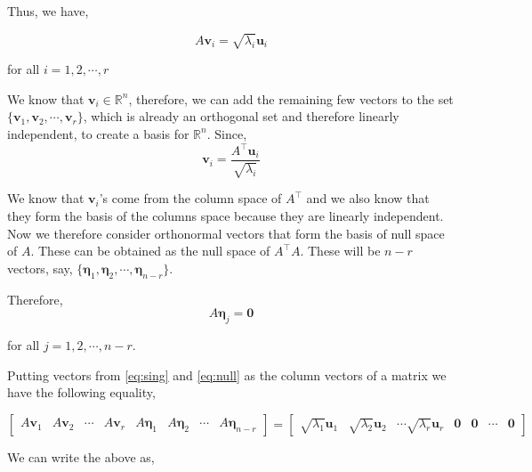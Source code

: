 \documentclass[a4paper]{article}
\begin{document}
Thus, we have,

\begin{equation}
A\boldsymbol{v}_i = \sqrt{\lambda_{i}}\boldsymbol{u}_i
\label{eq:sing}
\end{equation}

for all $i=1,2,\cdots,r$

We know that $\boldsymbol{v}_i \in \mathbb{R}^{n}$, therefore, we can add the remaining few vectors to the set $\{ \boldsymbol{v}_1, \boldsymbol{v}_2, \cdots, \boldsymbol{v}_r \}$, which is already an orthogonal set and therefore linearly independent, to create a basis for $\mathbb{R}^n$. Since, \begin{equation*}
\boldsymbol{v}_i = \frac{A^{\top}\boldsymbol{u}_i}{\sqrt{\lambda_i}}
\end{equation*}

We know that $\boldsymbol{v}_i$'s come from the column space of $A^{\top}$ and we also know that they form the basis of the columns space because they are linearly independent. Now we therefore consider orthonormal vectors that form the basis of null space of $A$. These can be obtained as the null space of $A^{\top}A$. These will be $n-r$ vectors, say, $\{ \boldsymbol{\eta}_1, \boldsymbol{\eta}_2, \cdots, \boldsymbol{\eta}_{n-r} \}$.

Therefore, \begin{equation}
A \boldsymbol{\eta}_j = \boldsymbol{0}
\label{eq:null}
\end{equation}

for all $j=1,2,\cdots,n-r$.

Putting vectors from \ref{eq:sing} and \ref{eq:null} as the column vectors of a matrix we have the following equality,

\begin{equation}
\begin{bmatrix}
A \boldsymbol{v}_1 & A \boldsymbol{v}_2 & \cdots & A \boldsymbol{v}_r & A \boldsymbol{\eta}_1 & A \boldsymbol{\eta}_2 & \cdots &A \boldsymbol{\eta}_{n-r}
\end{bmatrix} = \begin{bmatrix}
\sqrt{\lambda_{1}}\boldsymbol{u}_1 & \sqrt{\lambda_{2}}\boldsymbol{u}_2 &
\cdots \sqrt{\lambda_{r}}\boldsymbol{u}_r & \boldsymbol{0} & \boldsymbol{0} & \cdots & \boldsymbol{0}
\end{bmatrix}
\end{equation}

We can write the above as,
\end{document}
